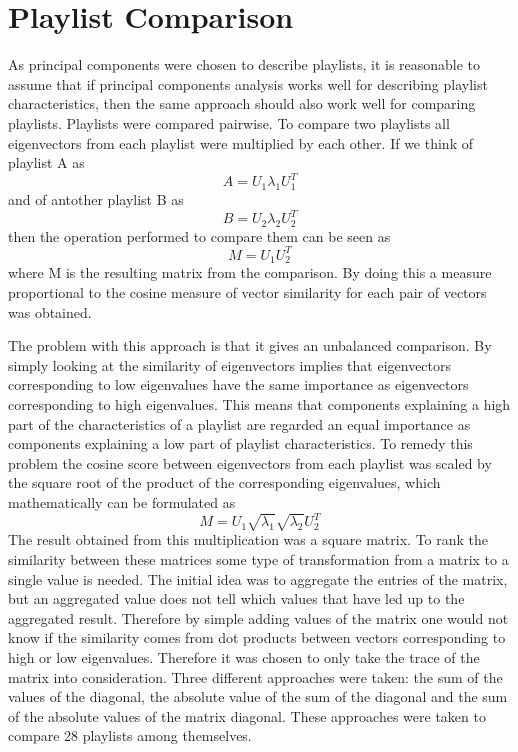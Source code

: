 \documentclass[a4paper,11pt]{kth-mag}
\begin{document}
\section{Playlist Comparison}
As principal components were chosen to describe playlists, it is reasonable to assume that if principal components analysis works well for describing playlist characteristics, then the same approach should also work well for comparing playlists. Playlists were compared pairwise. To compare two playlists all eigenvectors from each playlist were multiplied by each other. If we think of playlist A as  \[A = U_1 \lambda_1 U_1^T\] and of antother playlist B as \[B = U_2 \lambda_2 U_2^T\] then the operation performed to compare them can be seen as \[M = U_1 U_2^T\] where M is the resulting matrix from the comparison. By doing this a measure proportional to the cosine measure of vector similarity for each pair of vectors was obtained. 

The problem with this approach is that it gives an unbalanced comparison. By simply looking at the similarity of eigenvectors implies that eigenvectors corresponding to low eigenvalues have the same importance as eigenvectors corresponding to high eigenvalues. This means that components explaining a high part of the characteristics of a playlist are regarded an equal importance as components explaining a low part of playlist characteristics. To remedy this problem the cosine score between eigenvectors from each playlist was scaled by the square root of the product of the corresponding eigenvalues, which mathematically can be formulated as  \[M = U_1 \sqrt{\lambda_1} \sqrt{\lambda_2} U_2^T \] The result obtained from this multiplication was a square matrix. To rank the similarity between these matrices some type of transformation from a matrix to a single value is needed. The initial idea was to aggregate the entries of the matrix, but an aggregated value does not tell which values that have led up to the aggregated result. Therefore by simple adding values of the matrix one would not know if the similarity comes from dot products between vectors corresponding to high or low eigenvalues. Therefore it was chosen to only take the trace of the matrix into consideration. Three different approaches were taken: the sum of the values of the diagonal, the absolute value of the sum of the diagonal and the sum of the absolute values of the matrix diagonal. These approaches were taken to compare 28 playlists among themselves.
\end{document}
